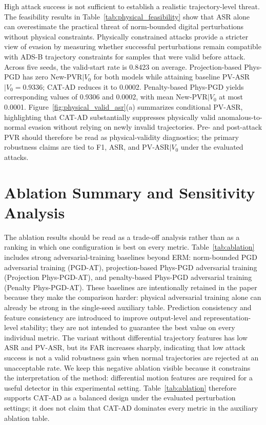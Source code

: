 \documentclass[runningheads]{llncs}
\begin{document}
High attack success is not sufficient to establish a realistic trajectory-level threat.
The feasibility results in Table~\ref{tab:physical_feasibility} show that ASR alone can overestimate the practical threat of norm-bounded digital perturbations without physical constraints.
Physically constrained attacks provide a stricter view of evasion by measuring whether successful perturbations remain compatible with ADS-B trajectory constraints for samples that were valid before attack.
Across five seeds, the valid-start rate is 0.8423 on average. Projection-based Phys-PGD has zero New-PVR$\mid V_0$ for both models while attaining baseline PV-ASR$\mid V_0=0.9336$; CAT-AD reduces it to 0.0002. Penalty-based Phys-PGD yields corresponding values of 0.9306 and 0.0002, with mean New-PVR$\mid V_0$ at most 0.0001.
Figure~\ref{fig:physical_valid_asr}(a) summarizes conditional PV-ASR, highlighting that CAT-AD substantially suppresses physically valid anomalous-to-normal evasion without relying on newly invalid trajectories.
Pre- and post-attack PVR should therefore be read as physical-validity diagnostics; the primary robustness claims are tied to F1, ASR, and PV-ASR$\mid V_0$ under the evaluated attacks.



\section{Ablation Summary and Sensitivity Analysis}
\label{sec:ablation_summary}

The ablation results should be read as a trade-off analysis rather than as a ranking in which one configuration is best on every metric.
Table~\ref{tab:ablation} includes strong adversarial-training baselines beyond ERM: norm-bounded PGD adversarial training (PGD-AT), projection-based Phys-PGD adversarial training (Projection Phys-PGD-AT), and penalty-based Phys-PGD adversarial training (Penalty Phys-PGD-AT).
These baselines are intentionally retained in the paper because they make the comparison harder: physical adversarial training alone can already be strong in the single-seed auxiliary table.
Prediction consistency and feature consistency are introduced to improve output-level and representation-level stability; they are not intended to guarantee the best value on every individual metric.
The variant without differential trajectory features has low ASR and PV-ASR, but its FAR increases sharply, indicating that low attack success is not a valid robustness gain when normal trajectories are rejected at an unacceptable rate.
We keep this negative ablation visible because it constrains the interpretation of the method: differential motion features are required for a useful detector in this experimental setting.
Table~\ref{tab:ablation} therefore supports CAT-AD as a balanced design under the evaluated perturbation settings; it does not claim that CAT-AD dominates every metric in the auxiliary ablation table.
\end{document}
